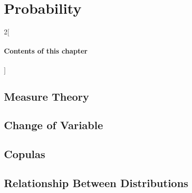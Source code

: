 \chapter{Probability}

\begin{multicols}{2}[\subsubsection*{Contents of this chapter}]
\end{multicols}


\section{Measure Theory}

\section{Change of Variable}


\section{Copulas}


\section{Relationship Between Distributions}
